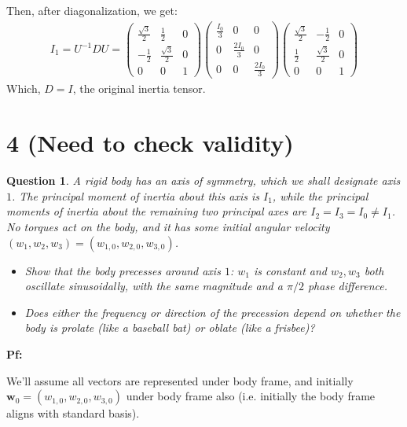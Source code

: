\documentclass{article}
\newtheorem{question}{Question}
\newcommand{\bw}{\textbf{w}} %
\begin{document}
Then, after diagonalization, we get:
\begin{align}
    I_1 = U^{-1}DU = \begin{pmatrix}
        \frac{\sqrt{3}}{2}&\frac{1}{2}&0\\
        -\frac{1}{2}&\frac{\sqrt{3}}{2}&0\\
        0&0&1
    \end{pmatrix}\begin{pmatrix}
        \frac{I_0}{3}&0&0\\
        0&\frac{2I_0}{3}&0\\
        0&0&\frac{2I_0}{3}
    \end{pmatrix}\begin{pmatrix}
        \frac{\sqrt{3}}{2}&-\frac{1}{2}&0\\
        \frac{1}{2}&\frac{\sqrt{3}}{2}&0\\
        0&0&1
    \end{pmatrix}
\end{align}
Which, $D=I$, the original inertia tensor.

\break

\section*{4 (Need to check validity)}
\begin{question}\label{q4}
    A rigid body has an axis of symmetry, which we shall designate axis $1$. The principal moment of inertia about this axis is $I_1$, while the principal moments of inertia about the remaining two principal axes are $I_2=I_3=I_0\neq I_1$. No torques act on the body, and it has some initial angular velocity $(w_1,w_2,w_3)=(w_{1,0},w_{2,0},w_{3,0})$.
    \begin{itemize}
        \item[(a)] Show that the body precesses around axis $1$: $w_1$ is constant and $w_2,w_3$ both oscillate sinusoidally, with the same magnitude and a $\pi/2$ phase difference.
        \item[(b)] Does either the frequency or direction of the precession depend on whether the body is prolate (like a baseball bat) or oblate (like a frisbee)? 
    \end{itemize}
\end{question}

\textbf{Pf:}

We'll assume all vectors are represented under body frame, and initially $\bw_0 = (w_{1,0},w_{2,0},w_{3,0})$ under body frame also (i.e. initially the body frame aligns with standard basis).
\end{document}
